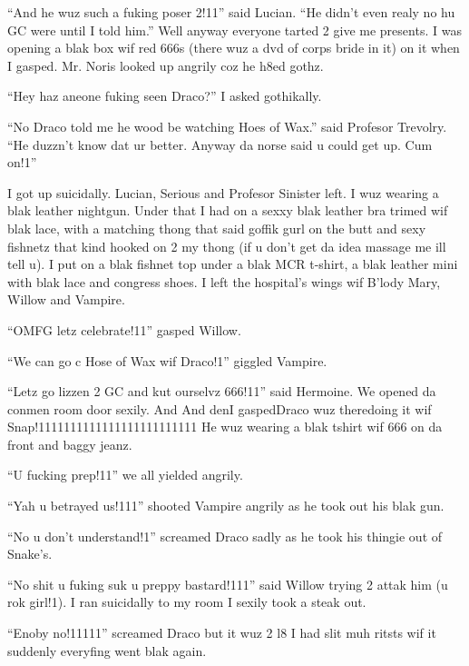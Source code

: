 \enquote{And he wuz such a fuking poser 2!11} said Lucian. \enquote{He didn't even realy no hu GC were until I told him.} Well anyway everyone tarted 2 give me presents. I was opening a blak box wif red 666s (there wuz a dvd of corps bride in it) on it when I gasped. Mr. Noris looked up angrily coz he h8ed gothz.

\enquote{Hey haz aneone fuking seen Draco?} I asked gothikally.

\enquote{No Draco told me he wood be watching Hoes of Wax.} said Profesor Trevolry. \enquote{He duzzn't know dat ur better. Anyway da norse said u could get up. Cum on!1}

I got up suicidally. Lucian, Serious and Profesor Sinister left. I wuz wearing a blak leather nightgun. Under that I had on a sexxy blak leather bra trimed wif blak lace, with a matching thong that said goffik gurl on the butt and sexy fishnetz that kind hooked on 2 my thong (if u don't get da idea massage me ill tell u). I put on a blak fishnet top under a blak MCR t-shirt, a blak leather mini with blak lace and congress shoes. I left the hospital's wings wif B'lody Mary, Willow and Vampire.

\enquote{OMFG letz celebrate!11} gasped Willow.

\enquote{We can go c Hose of Wax wif Draco!1} giggled Vampire.

\enquote{Letz go lizzen 2 GC and kut ourselvz 666!11} said Hermoine. We opened da conmen room door sexily. And And den\dotfill\newline I gasped\dotfill Draco wuz there\newline doing it wif Snap!1111111111111111111111111 He wuz wearing a blak tshirt wif 666 on da front and baggy jeanz.

\enquote{U fucking prep!11} we all yielded angrily.

\enquote{Yah u betrayed us!111} shooted Vampire angrily as he took out his blak gun.

\enquote{No u don't understand!1} screamed Draco sadly as he took his thingie out of Snake's.

\enquote{No shit u fuking suk u preppy bastard!111} said Willow trying 2 attak him (u rok girl!1). I ran suicidally to my room I sexily took a steak out.

\enquote{Enoby no!11111} screamed Draco but it wuz 2 l8 I had slit muh ritsts wif it suddenly everyfing went blak again.

\begin{sloppypar}
\end{sloppypar}
